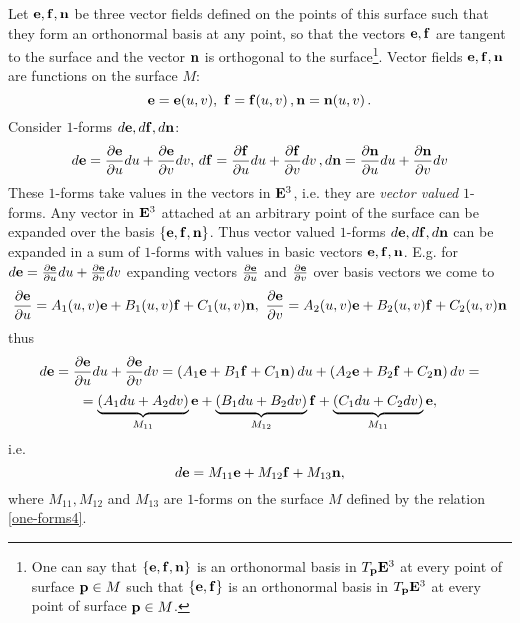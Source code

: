 \documentclass[12pt]{article}
\theoremstyle{theorem}
\numberwithin{equation}{section}
\begin{document}
   Let ${{\bf e},{\bf f},{\bf n}}$ be three vector fields defined on the points of this surface
   such that they form an orthonormal basis at any point, so that the vectors ${\bf e},{\bf f}$ are tangent to the surface
   and  the vector ${\bf n}$ is orthogonal to the surface\footnote{
   One can say that $\{{\bf e},{\bf f},{\bf n}\}$ is an orthonormal basis in $T_{{\bf p}}{\bf E}^3$ at every point of surface  ${\bf p}\in M$
such that $\{{\bf e},{\bf f}\}$ is an orthonormal basis in $T_{{\bf p}}{\bf E}^3$ at every point of surface  ${\bf p}\in M$.}.
   Vector fields ${\bf e},{\bf f},{\bf n}$ are functions on the surface $M$:
                   $$
          {\bf e}={\bf e}(u,v),\,\, {\bf f}={\bf f}(u,v)\,, {\bf n}={\bf n}(u,v)\,.
                   $$
 Consider $1$-forms $d{\bf e},d{\bf f},d{\bf n}$:
              $$
       d{\bf e}={\partial {\bf e}\over \partial u}du+{\partial {\bf e}\over \partial v}dv,\,
       d{\bf f}={\partial {\bf f}\over \partial u}du+{\partial {\bf f}\over \partial v}dv\,,
       d{\bf n}={\partial {\bf n}\over \partial u}du+{\partial {\bf n}\over \partial v}dv
              $$
 These $1$-forms take values in the vectors in ${\bf E}^3$, i.e. they are {\it vector valued} $1$-forms.
 Any vector in ${\bf E}^3$ attached at an arbitrary point of the surface
 can be expanded over the basis  $\{{\bf e},{\bf f},{\bf n}\}$. Thus vector valued $1$-forms $d{\bf e},d{\bf f},d{\bf n}$ can be expanded
 in a sum of $1$-forms with values in basic vectors  ${\bf e},{\bf f},{\bf n}$. E.g.
 for $d{\bf e}={\partial {\bf e}\over \partial u}du+{\partial {\bf e}\over \partial v}dv$ expanding   vectors
 ${\partial {\bf e}\over \partial u}$ and ${\partial {\bf e}\over \partial v}$ over basis vectors we come to
            $$
      {\partial {\bf e}\over \partial u}=A_1(u,v){\bf e}+B_1(u,v){\bf f}+C_1(u,v){\bf n},\,\,
      {\partial {\bf e}\over \partial v}=A_2(u,v){\bf e}+B_2(u,v){\bf f}+C_2(u,v){\bf n}
            $$
 thus
          $$
   d{\bf e}={\partial {\bf e}\over \partial u}du+{\partial {\bf e}\over \partial v}dv=\left(A_1{\bf e}+B_1{\bf f}+C_1{\bf n}\right)du+\left(A_2{\bf e}+B_2{\bf f}+C_2{\bf n}\right)dv=
          $$
           \begin{equation}\label{one-forms4}
 =\underbrace{(A_1du+A_2dv)}_{M_{11}}{\bf e}+
 \underbrace{(B_1du+B_2dv)}_{M_{12}}{\bf f}+\underbrace{(C_1du+C_2dv)}_{M_{11}}{\bf e},
           \end{equation}
 i.e.
            $$
       d{\bf e}=M_{11}{\bf e}+M_{12}{\bf f}+M_{13}{\bf n},
            $$
where $M_{11}, M_{12}$ and $M_{13}$ are $1$-forms on the surface $M$ defined by the relation \eqref{one-forms4}.
\end{document}
